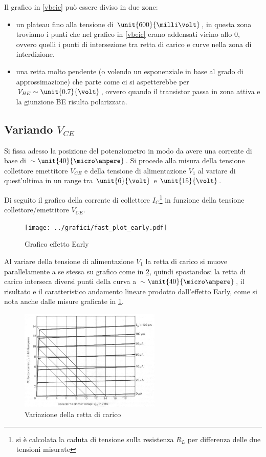 \documentclass[10pt,a4paper]{article}
\begin{document}
Il grafico in \figurename{\ref{vbeic}} può essere diviso in due zone:
\begin{itemize}
	\item un plateau fino alla tensione di $\unit{600}{\milli\volt}$, in questa zona troviamo i punti che nel grafico in \figurename{\ref{vbeic}} erano addensati vicino allo $0$, ovvero quelli i punti di intersezione tra retta di carico e curve nella zona di interdizione.
	\item una retta molto pendente (o volendo un esponenziale in base al grado di approssimazione) che parte come ci si aspetterebbe per $V_{BE} \sim \unit{0.7}{\volt}$, ovvero quando il transistor passa in zona attiva e la giunzione BE risulta polarizzata.
\end{itemize}

\subsection{Variando $V_{CE}$}
Si fissa adesso la posizione del potenziometro in modo da avere una corrente di base di $\sim \unit{40}{\micro\ampere}$. Si procede alla misura della tensione collettore emettitore $V_{CE}$ e della tensione di alimentazione $V_1$ al variare di quest'ultima in un range tra $\unit{6}{\volt}$ e $\unit{15}{\volt}$.

Di seguito il grafico della corrente di collettore $I_C$\footnote{si è calcolata la caduta di tensione sulla resistenza $R_L$ per differenza delle due tensioni misurate} in funzione della tensione collettore/emettitore $V_{CE}$.

\begin{figure}[h!]
	\centering
	\begin{minipage}[h!]{0.3\textwidth}
		\centering
		\resizebox{\textwidth}{!}{
			}
	\end{minipage}
	\begin{minipage}[d]{0.69\textwidth}
		\centering
		\texttt{[image: ../grafici/fast\_plot\_early.pdf]}
		\caption{Grafico effetto Early}
		\label{early}
	\end{minipage}
\end{figure}

Al variare della tensione di alimentazione $V_1$ la retta di carico si muove parallelamente a se stessa su grafico come in \figurename{\ref{retta_spostamento}}, quindi spostandosi la retta di carico interseca diversi punti della curva a  $\sim \unit{40}{\micro\ampere}$, il risultato e il caratteristico andamento lineare prodotto dall'effetto Early, come si nota anche dalle misure graficate in \figurename{\ref{early}}.

\begin{figure}[h!]
	\centering
	\includegraphics[width=0.6\textwidth]{../grafici/spostamento_retta.jpg}
	\caption{Variazione della retta di carico}
	\label{retta_spostamento}
\end{figure}
\end{document}
